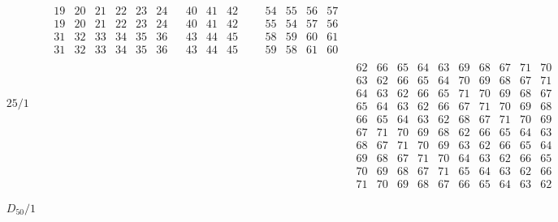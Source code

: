 \documentclass[11pt,a4paper]{amsart}
\begin{document}
\begin{align*}
\begin{array}{r||c|c|c|c|c|c}
\begin{array}{r}
    \end{array}
    &
\begin{array}{r|r|r|r|r|r}
19&20&21&22&23&24\\
19&20&21&22&23&24\\ \hline
31&32&33&34&35&36\\
31&32&33&34&35&36
\end{array}
&
\begin{array}{r|r|r}%
40&41&42\\
40&41&42\\ \hline
43&44&45\\
43&44&45
\end{array}
&&
\begin{array}{rr|rr}
54&55&56&57\\
55&54&57&56\\ \hline
58&59&60&61\\
59&58&61&60
\end{array}
&& \\ \hline
    \begin{array}{r}
25/1\\ \\ \\ \\ \\ \\ \\ \\ \\ \\
    \end{array}
    &&&&&
\begin{array}{rrrrrrrrrr}%
62&66&65&64&63&69&68&67&71&70\\%
63&62&66&65&64&70&69&68&67&71\\%
64&63&62&66&65&71&70&69&68&67\\%
65&64&63&62&66&67&71&70&69&68\\%
66&65&64&63&62&68&67&71&70&69\\%
67&71&70&69&68&62&66&65&64&63\\%
68&67&71&70&69&63&62&66&65&64\\%
69&68&67&71&70&64&63&62&66&65\\%
70&69&68&67&71&65&64&63&62&66\\%
71&70&69&68&67&66&65&64&63&62\\%
\end{array}%
& \\ \hline
    \begin{array}{r}
D_{50}/1\\ \\ \\ \\ \\ \\ \\ \\ \\ \\

\end{array}
\end{array}
\end{align*}
\end{document}
